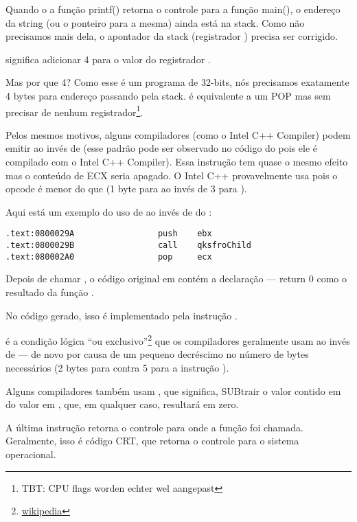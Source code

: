 Quando o a função printf() retorna o controle para a função main(), o endereço da string (ou o ponteiro para a mesma) ainda está na stack.
Como não precisamos mais dela, o apontador da stack (registrador \ESP) precisa ser corrigido.

 significa adicionar 4 para o valor do registrador \ESP.

Mas por que 4? Como esse é um programa de 32-bits, nós precisamos exatamente 4 bytes para endereço passando pela stack.
 é equivalente a um POP mas sem precisar de nenhum registrador\footnote{\ac{TBT}: CPU flags worden echter wel aangepast}.

\myindex{\oracle}

Pelos mesmos motivos, alguns compiladores (como o Intel C++ Compiler) podem emitir  ao invés de \ADD (esse padrão pode ser observado no código do \oracle{} pois ele é compilado com o Intel C++ Compiler).
Essa instrução tem quase o mesmo efeito mas o conteúdo de ECX seria apagado.
O Intel C++ provavelmente usa  pois o opcode é menor do que  (1 byte para \POP ao invés de 3 para \ADD).

Aqui está um exemplo do uso de \POP ao invés de \ADD do \oracle{}:

\begin{lstlisting}[caption=\oracle 10.2 Linux (app.o file),style=customasm]
.text:0800029A                 push    ebx
.text:0800029B                 call    qksfroChild
.text:080002A0                 pop     ecx
\end{lstlisting}

Depois de chamar \printf{}, o código original em \CCpp contém a declaração  --- return 0 como o resultado da função \main{}.

No código gerado, isso é implementado pela instrução .


\XOR é a condição lógica ``ou exclusivo''\footnote{\href{http://go.yurichev.com/17118}{wikipedia}} que os compiladores geralmente usam ao invés de 
 --- de novo por causa de um pequeno decréscimo no número de bytes necessários (2 bytes para \XOR contra 5 para a instrução \MOV).

Alguns compiladores também usam , que significa, SUBtrair o valor contido em \EAX do valor em \EAX, que, em qualquer caso, resultará em zero.

A última instrução \RET retorna o controle para onde a função foi chamada. Geralmente, isso é código \CCpp \ac{CRT}, que retorna o controle para o sistema operacional.

